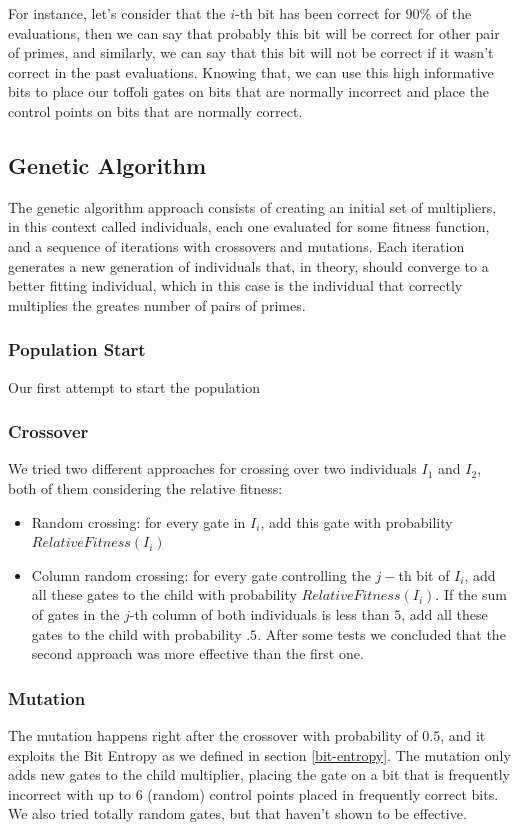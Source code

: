 \documentclass[12pt]{article}
\begin{document}
For instance, let's consider that the $i$-th bit has been correct for $90\%$ of the evaluations, then we can say that probably this bit will be correct for other pair of primes, and similarly, we can say that this bit will not be correct if it wasn't correct in the past evaluations. Knowing that, we can use this high informative bits to place our toffoli gates on bits that are normally incorrect and place the control points on bits that are normally correct.

\subsection{Genetic Algorithm}
The genetic algorithm approach consists of creating an initial set of multipliers, in this context called individuals, each one evaluated for some fitness function, and a sequence of iterations with crossovers and mutations. Each iteration generates a new generation of individuals that, in theory, should converge to a better fitting individual, which in this case is the individual that correctly multiplies the greates number of pairs of primes.

\subsubsection{Population Start}
Our first attempt to start the population 
\subsubsection{Crossover}
We tried two different approaches for crossing over two individuals $I_1$ and $I_2$, both of them considering the relative fitness:
\begin{itemize}
    \item{Random crossing: for every gate in $I_i$, add this gate with probability $RelativeFitness (I_i)$}
    \item{Column random crossing: for every gate controlling the $j-$th bit of $I_i$, add all these gates to the child with probability $RelativeFitness (I_i)$. If the sum of gates in the $j$-th column of both individuals is less than $5$, add all these gates to the child with probability $.5$.}
    After some tests we concluded that the second approach was more effective than the first one.
\end{itemize}

\subsubsection{Mutation}
The mutation happens right after the crossover with probability of $0.5$, and it exploits the Bit Entropy as we defined in section \ref{bit-entropy}. The mutation only adds new gates to the child multiplier, placing the gate on a bit that is frequently incorrect with up to $6$ (random) control points placed in frequently correct bits. We also tried totally random gates, but that haven't shown to be effective.
\end{document}
